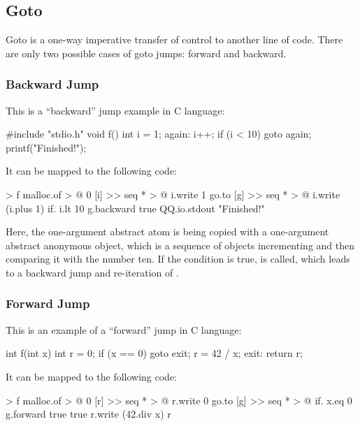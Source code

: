 \documentclass[sigplan,nonacm]{acmart}
\begin{document}
\subsection{Goto}
\label{sec:goto}

Goto is a one-way imperative transfer of control to another line of code.
There are only two possible cases of goto jumps: forward and backward.

\subsubsection{Backward Jump}

This is a ``backward'' jump example in C language:

\begin{ffcode}
#include "stdio.h"
void f() {
  int i = 1;
  again:
  i++;
  if (i < 10) goto again;
  printf("Finished!");
}
\end{ffcode}

It can be mapped to the following \eolang{} code:

\begin{ffcode}
[] > f
  malloc.of > @
    0
    [i] >>
      seq * > @
        i.write 1
        go.to
          [g] >>
            seq * > @
              i.write (i.plus 1)
              if.
                i.lt 10
                g.backward
                true
        QQ.io.stdout "Finished!"
\end{ffcode}

Here, the one-argument abstract atom  is being copied with a one-argument abstract anonymous object, which is a sequence of objects incrementing  and then comparing it with the number ten.
If the condition is true,  is called, which leads to a backward jump and re-iteration of .

\subsubsection{Forward Jump}

This is an example of a ``forward'' jump in C language:

\begin{ffcode}
int f(int x) {
  int r = 0;
  if (x == 0) goto exit;
  r = 42 / x;
  exit:
  return r;
}
\end{ffcode}

It can be mapped to the following \eolang{} code:

\begin{ffcode}
[x] > f
  malloc.of > @
    0
    [r] >>
      seq * > @
        r.write 0
        go.to
          [g] >>
            seq * > @
              if.
                x.eq 0
                g.forward true
                true
              r.write (42.div x)
        r
\end{ffcode}
\end{document}
